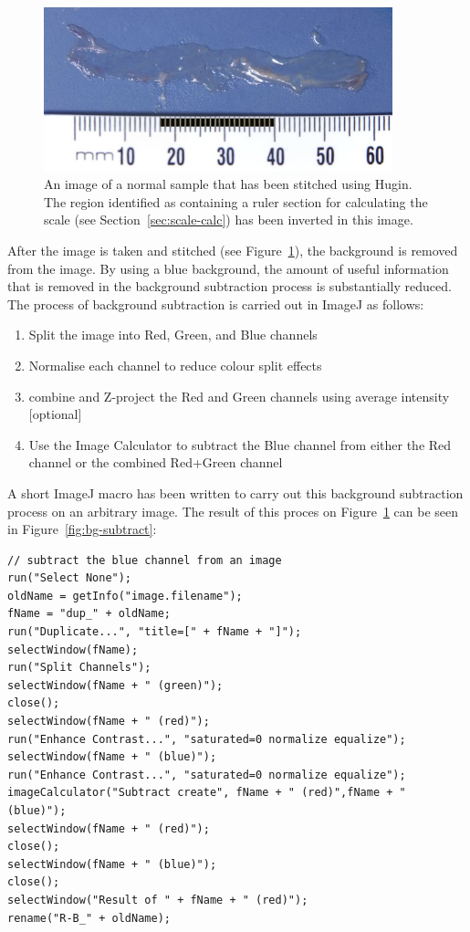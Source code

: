 \documentclass[a4paper]{scrartcl}
\begin{document}
\begin{figure}
  \centering
  \includegraphics[width=0.9\textwidth]{illustrations/small_DkrPaint.jpg}
  \caption{An image of a normal sample that has been stitched using
    Hugin. The region identified as containing a ruler section for
    calculating the scale (see Section~\ref{sec:scale-calc}) has been
    inverted in this image.}
  \label{fig:stitched-image}
\end{figure}

After the image is taken and stitched (see
Figure~\ref{fig:stitched-image}), the background is removed from the
image. By using a blue background, the amount of useful information
that is removed in the background subtraction process is substantially
reduced. The process of background subtraction is carried out in
ImageJ as follows:

\begin{enumerate}
\item Split the image into Red, Green, and Blue channels
\item Normalise each channel to reduce colour split effects
\item combine and Z-project the Red and Green channels using average intensity [optional]
\item Use the Image Calculator to subtract the Blue channel from
  either the Red channel or the combined Red+Green channel
\end{enumerate}

A short ImageJ macro has been written to carry out this background
subtraction process on an arbitrary image. The result of this proces
on Figure~\ref{fig:stitched-image} can be seen in
Figure~\ref{fig:bg-subtract}:

\begin{Verbatim}
// subtract the blue channel from an image
run("Select None");
oldName = getInfo("image.filename");
fName = "dup_" + oldName;
run("Duplicate...", "title=[" + fName + "]");
selectWindow(fName);
run("Split Channels");
selectWindow(fName + " (green)");
close();
selectWindow(fName + " (red)");
run("Enhance Contrast...", "saturated=0 normalize equalize");
selectWindow(fName + " (blue)");
run("Enhance Contrast...", "saturated=0 normalize equalize");
imageCalculator("Subtract create", fName + " (red)",fName + " (blue)");
selectWindow(fName + " (red)");
close();
selectWindow(fName + " (blue)");
close();
selectWindow("Result of " + fName + " (red)");
rename("R-B_" + oldName);
\end{Verbatim}
\end{document}
